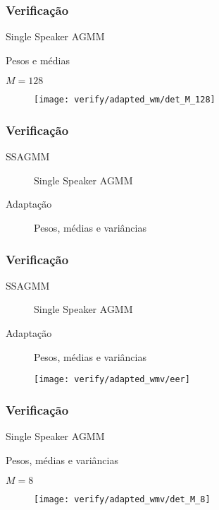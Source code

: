 \begin{frame}
\frametitle{Verificação}
\begin{description}
    \item[SSAGMM] Single Speaker AGMM
    \item[Adaptação] Pesos e médias
    \item $M = 128$
\end{description}

\begin{figure}[ht]
    \centering
    \texttt{[image: verify/adapted\_wm/det\_M\_128]}
\end{figure}
\end{frame}

\begin{frame}
\frametitle{Verificação}
\begin{description}
    \item[SSAGMM] Single Speaker AGMM
    \item[Adaptação] Pesos, médias e variâncias
\end{description}


\end{frame}

\begin{frame}
\frametitle{Verificação}
\begin{description}
    \item[SSAGMM] Single Speaker AGMM
    \item[Adaptação] Pesos, médias e variâncias
\end{description}

\begin{figure}[ht]
    \centering
    \texttt{[image: verify/adapted\_wmv/eer]}
\end{figure}
\end{frame}

\begin{frame}
\frametitle{Verificação}
\begin{description}
    \item[SSAGMM] Single Speaker AGMM
    \item[Adaptação] Pesos, médias e variâncias
    \item $M = 8$
\end{description}

\begin{figure}[ht]
    \centering
    \texttt{[image: verify/adapted\_wmv/det\_M\_8]}
\end{figure}
\end{frame}

